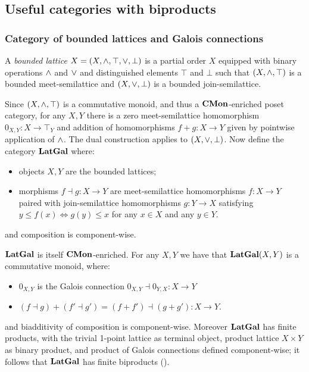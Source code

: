 \subsection{Useful categories with biproducts}
\label{sec:categories-with-biproducts}

\subsubsection{Category of bounded lattices and Galois connections}
\label{sec:categories-with-biproducts:latgal}

\begin{definition}
A \emph{bounded lattice} $X = (X, \wedge, \top, \vee, \bot)$ is a partial order $X$ equipped with binary
operations $\wedge$ and $\vee$ and distinguished elements $\top$ and $\bot$ such that $(X, \wedge, \top)$ is a
bounded meet-semilattice and $(X, \vee, \bot)$ is a bounded join-semilattice.
\end{definition}

\noindent Since $(X, \wedge, \top)$ is a commutative monoid, and thus a $\mathbf{CMon}$-enriched poset category, for
any $X, Y$ there is a zero meet-semilattice homomorphism $0_{X,Y}: X \to \top_Y$ and addition of homomorphisms
$f + g: X \to Y$ given by pointwise application of $\wedge$. The dual construction applies to $(X, \vee,
\bot)$. Now define the category $\mathbf{LatGal}$ where:
\begin{itemize}
\item objects $X, Y$ are the bounded lattices;
\item morphisms $f \dashv g: X \to Y$ are meet-semilattice homomorphisms $f: X \to Y$ paired with
join-semilattice homomorphisms $g: Y \to X$ satisfying $y \leq f(x) \iff g(y) \leq x$ for any $x \in X$ and any
$y \in Y$.
\end{itemize}

\noindent and composition is component-wise.

$\mathbf{LatGal}$ is itself $\mathbf{CMon}$-enriched. For any $X, Y$ we have that $\mathbf{LatGal}(X,Y)$ is a commutative monoid,
where:
\begin{itemize}
\item $0_{X,Y}$ is the Galois connection $0_{X,Y} \dashv 0_{Y,X}: X \to Y$
\item $(f \dashv g) + (f' \dashv g') = (f + f') \dashv (g + g'): X \to Y$.
\end{itemize}

\noindent and biadditivity of composition is component-wise. Moreover $\mathbf{LatGal}$ has finite products, with the
trivial 1-point lattice as terminal object, product lattice $X \times Y$ as binary product, and product of
Galois connections defined component-wise; it follows that $\mathbf{LatGal}$ has finite biproducts
().

